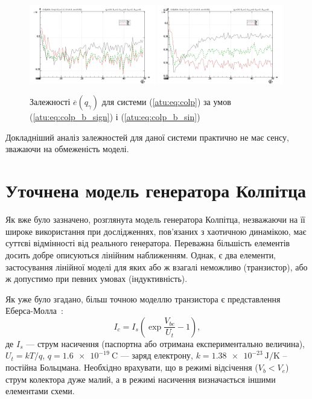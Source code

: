 \begin{figure}[htb!]
\centerline{
  \includegraphics[width=0.49\textwidth]{p/mod/colp_m5p-p_qg_e_sign.png}
  \includegraphics[width=0.49\textwidth]{p/mod/colp_m5p-p_qg_e_sin.png}
}
  \caption{Залежності  $\overline{e}(q_\gamma)$ для системи (\ref{atu:eq:colp})
  за умов (\ref{atu:eq:colp_b_sign}) і (\ref{atu:eq:colp_b_sin})
}
\label{atu:f:colp_e_qgamma}
\end{figure}

Докладніший аналіз залежностей для даної системи практично
не має сенсу, зважаючи на обмеженість моделі.




\section{Уточнена модель генератора Колпітца} %

Як вже було зазначено, розглянута модель генератора Колпітца,
незважаючи на її широке використання при дослідженнях,
пов'язаних з хаотичною динамікою, має суттєві відмінності від
реального генератора. Переважна більшість елементів досить
добре описуються лінійним наближенням. Однак, є два елементи,
застосування лінійної моделі для яких або ж взагалі неможливо
(транзистор), або ж допустимо при певних умовах (індуктивність).

Як уже було згадано, більш точною моделлю транзистора є представлення
Еберса-Молла~\cite{horowitz}:
%
\begin{equation}
  I_c = I_s \left( \exp\frac{V_{be}}{U_t} - 1 \right),
  \label{atu:eq:ebers-moll}
\end{equation}
%
де
$ I_s $ --- струм насичення (паспортна або отримана експериментально величина),
$U_t=kT/q$,
$q = \SI{1.6e-19}{\coulomb}$ --- заряд електрону,
$k = \SI{1.38e-23}{\joule/\kelvin}$ --
постійна Больцмана.
Необхідно врахувати, що в режимі відсічення ($ V_b <V_e $)
струм колектора дуже малий, а в режимі насичення
визначається іншими елементами схеми.

